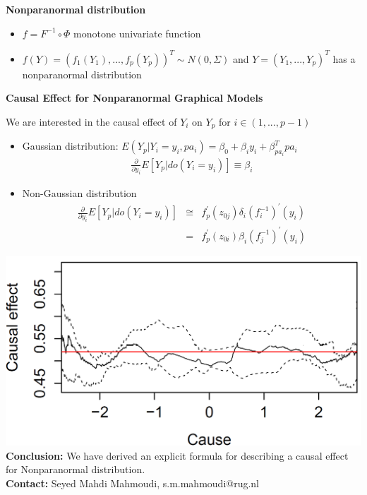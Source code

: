 \documentclass[a0paper,portrait]{baposter}
\newcommand{\doop}{do}
\begin{document}
\begin{poster}
{%
 \textbf{ Nonparanormal distribution}
\begin{itemize}
\item $f=F^{-1}\circ \Phi$   monotone univariate function
 \item$f(Y)=(f_1(Y_1),...,f_{p}(Y_{p}))^{T}\sim N(0,\Sigma) $ and
$Y=(Y_1,...,Y_p)^{T}$ has a nonparanormal distribution
\end{itemize}
  \textbf{Causal Effect for Nonparanormal Graphical Models }

 
 We are interested in the causal effect of $Y_i$ on $ Y_p$ for $i\in (1,...,p-1)$
 \begin{itemize}
\item Gaussian distribution: $E(Y_p|Y_i=y_i,pa_i)=\beta_0+\beta_i y_i+\beta_{pa_i}^T pa_i$
\begin{eqnarray*}
{\frac{\partial}{\partial y_i}} E[Y_p|\doop(Y_i = y_i)]\equiv\beta_i
\end{eqnarray*} 
\item  Non-Gaussian distribution
\begin{eqnarray*}
{\frac{\partial}{\partial y_i}} E[Y_p|\doop(Y_i = y_i)] &\cong &  f^{'}_p(z_{0j})\delta_i (f_i^{-1})^ {'}(y_i) \nonumber\\
&=& f_p^{'}(z_{0i})\beta_i (f_j^{-1})^ {'}(y_i)
\end{eqnarray*}
\end{itemize}
\vspace{-.5cm}
\hspace{1cm}\includegraphics[scale=0.2]{mahmodi1}
 \textbf{Conclusion: }
We have derived an explicit formula for describing a causal effect for Nonparanormal distribution.\\
\textbf{Contact: }Seyed Mahdi Mahmoudi, s.m.mahmoudi@rug.nl
}


\end{poster}
\end{document}
